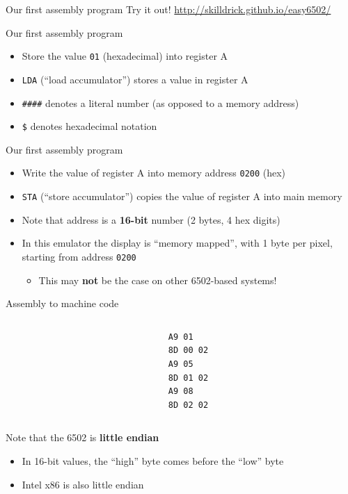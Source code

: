 \begin{frame}{Our first assembly program}
	\pause
	\pause Try it out! \url{http://skilldrick.github.io/easy6502/}
\end{frame}

\begin{frame}{Our first assembly program}
	\pause 
	\begin{itemize}
		\pause\item Store the value \texttt{01} (hexadecimal) into register A
		\pause\item \lstinline{LDA} (``load accumulator'') stores a value in register A
		\pause\item \lstinline{####} denotes a literal number (as opposed to a memory address)
		\pause\item \lstinline{$} denotes hexadecimal notation
		\phantom{\lstinline{$}} %
	\end{itemize}
\end{frame}

\begin{frame}{Our first assembly program}
	\pause 
	\begin{itemize}
		\pause\item Write the value of register A into memory address \texttt{0200} (hex)
		\pause\item \lstinline{STA} (``store accumulator'') copies the value of register A into main memory
		\pause\item Note that address is a \textbf{16-bit} number (2 bytes, 4 hex digits)
		\pause\item In this emulator the display is ``memory mapped'', with 1 byte per pixel, starting from address \texttt{0200}
			\begin{itemize}
				\item This may \textbf{not} be the case on other 6502-based systems!
			\end{itemize}
	\end{itemize}
\end{frame}

\begin{frame}[fragile]{Assembly to machine code}
	\begin{columns}
		\begin{column}{0.48\textwidth}
			\pause
		\end{column}
		\begin{column}{0.48\textwidth}
			\pause
			\begin{lstlisting}
A9 01
8D 00 02
A9 05
8D 01 02
A9 08
8D 02 02
			\end{lstlisting}
		\end{column}
	\end{columns}
	\pause Note that the 6502 is \textbf{little endian}
	\begin{itemize}
		\pause\item In 16-bit values, the ``high'' byte comes before the ``low'' byte
		\pause\item Intel x86 is also little endian
	\end{itemize}
\end{frame}


